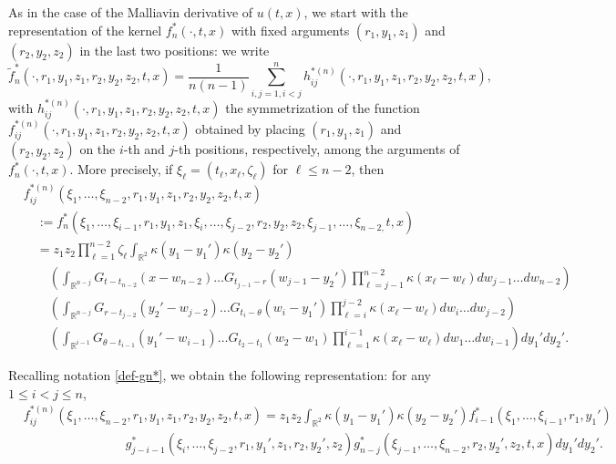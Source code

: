 \documentclass[12pt]{article}
\def\bR{\mathbb{R}}
\def\k{\kappa}
\begin{document}
As in the case of the Malliavin derivative of $u(t,x)$, we start with the representation of the kernel $f_{n}^*(\cdot,t,x)$ with fixed arguments $(r_1,y_1,z_1)$ and $(r_2,y_2,z_2)$ in the last two positions: we write
\begin{equation}
\label{fn*2}
\widetilde{f}_n^{*}(\cdot,r_1,y_1,z_1,r_2,y_2,z_2,t,x)=\frac{1}{n(n-1)}\sum_{i,j=1,i<j}^{n}
h_{ij}^{*(n)}(\cdot,r_1,y_1,z_1,r_2,y_2,z_2,t,x),
\end{equation}
with $h_{ij}^{*(n)}(\cdot,r_1,y_1,z_1,r_2,y_2,z_2,t,x)$ the symmetrization of the function $f_{ij}^{*(n)}(\cdot,r_1,y_1,z_1,r_2,y_2,z_2,t,x)$ obtained by placing $(r_1,y_1,z_1)$ and $(r_2,y_2,z_2)$ on the $i$-th and $j$-th positions, respectively, among the arguments of $f_n^*(\cdot,t,x)$. More precisely, if $\xi_{\ell}=(t_{\ell},x_{\ell},\zeta_{\ell})$ for $\ell \leq n-2$, then
\begin{align*}
& f_{ij}^{*(n)}(\xi_1,\ldots,\xi_{n-2},r_1,y_1,z_1,r_2,y_2,z_2,t,x)\\
&  \quad :=f_n^{*}(\xi_1,\ldots,\xi_{i-1},r_1,y_1,z_1,\xi_{i},\ldots,\xi_{j-2},r_2,y_2,z_2,\xi_{j-1},\ldots,
\xi_{n-2,}t,x)\\
& \quad = z_1 z_2 \prod_{\ell=1}^{n-2}\zeta_{\ell} \int_{\bR^{2}} \k(y_1-y_1') \k(y_2-y_2')\\
& \quad \quad \left(\int_{\bR^{n-j}} G_{t-t_{n-2}}(x-w_{n-2}) \ldots G_{t_{j-1}-r}(w_{j-1}-y_2')
\prod_{\ell=j-1}^{n-2}\k(x_{\ell}-w_{\ell}) dw_{j-1}\ldots dw_{n-2}\right) \\
& \quad \quad \left(\int_{\bR^{n-j}} G_{r-t_{j-2}}(y_2'-w_{j-2}) \ldots G_{t_{i}-\theta}(w_{i}-y_1') 
\prod_{\ell=i}^{j-2}\k(x_{\ell}-w_{\ell}) dw_{i}\ldots dw_{j-2}\right) \\
& \quad \quad \left(\int_{\bR^{i-1}} G_{\theta-t_{i-1}}(y_1'-w_{i-1}) \ldots G_{t_{2}-t_1}(w_2-w_1) 
\prod_{\ell=1}^{i-1}\k(x_{\ell}-w_{\ell}) dw_{1}\ldots dw_{i-1}\right) dy_1'dy_2'.
\end{align*}

Recalling notation \eqref{def-gn*}, we obtain the following representation: for any $1\leq i<j \leq n$,
\begin{align*}
& f_{ij}^{*(n)}(\xi_1,\ldots,\xi_{n-2},r_1,y_1,z_1,r_2,y_2,z_2,t,x)=z_1 z_2 \int_{\bR^{2}} \k(y_1-y_1') \k(y_2-y_2') f_{i-1}^*(\xi_1,\ldots,\xi_{i-1},r_1,y_1')\\
& \qquad \qquad \qquad \qquad g_{j-i-1}^*(\xi_i,\ldots,\xi_{j-2},r_1,y_1',z_1,r_2,y_2',z_2) g_{n-j}^*(\xi_{j-1},\ldots,\xi_{n-2},r_2,y_2',z_2,t,x)dy_1'dy_2'.
\end{align*}
\end{document}
